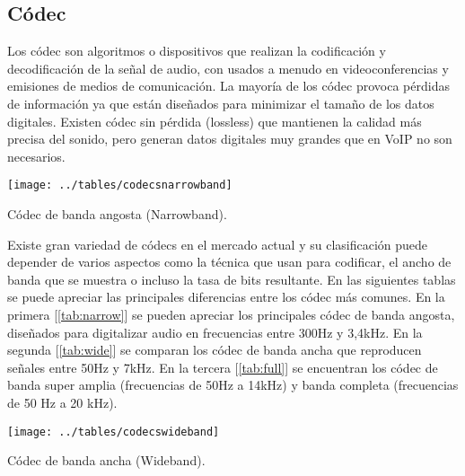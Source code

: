 \subsection{Códec}

Los códec son algoritmos o dispositivos que realizan la codificación y decodificación de la señal de audio, con usados a menudo en videoconferencias y emisiones de medios de comunicación. La mayoría de los códec provoca pérdidas de información ya que están diseñados para minimizar el tamaño de los datos digitales. Existen códec sin pérdida (lossless) que mantienen la calidad más precisa del sonido, pero generan datos digitales muy grandes que en VoIP no son necesarios.

		\begin{table}[h]
			
			\texttt{[image: ../tables/codecsnarrowband]}
			
			\caption{Códec de banda angosta (Narrowband).}
			
			\centering
			
			\label{tab:narrow}
		\end{table}


Existe gran variedad de códecs en el mercado actual y su clasificación puede depender de varios aspectos como la técnica que usan para codificar, el ancho de banda que se muestra o incluso la tasa de bits resultante. En las siguientes tablas se puede apreciar las principales diferencias entre los códec más comunes. En la primera [\ref{tab:narrow}] se pueden apreciar los principales códec de banda angosta, diseñados para digitalizar audio en frecuencias entre 300Hz y 3,4kHz. En la segunda [\ref{tab:wide}] se comparan los códec de banda ancha que reproducen señales entre 50Hz y 7kHz. En la tercera [\ref{tab:full}] se encuentran los códec de banda super amplia (frecuencias de 50Hz a 14kHz) y banda completa (frecuencias de 50 Hz a 20 kHz).

	\begin{table}[h]
	
		\texttt{[image: ../tables/codecswideband]}
		
		\caption{Códec de banda ancha (Wideband).}
		
		\centering
		
		\label{tab:wide}
	\end{table}

